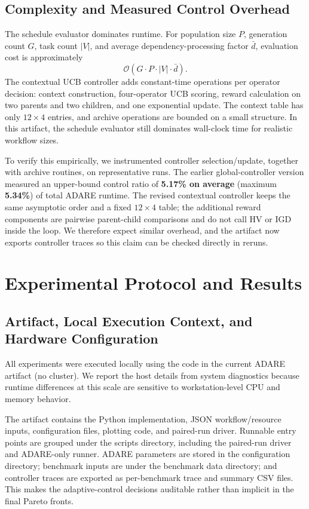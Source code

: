 \documentclass[runningheads]{llncs}
\begin{document}
\subsection{Complexity and Measured Control Overhead}
The schedule evaluator dominates runtime. For population size $P$, generation count $G$, task count $|V|$, and average dependency-processing factor $\bar d$, evaluation cost is approximately
\begin{equation}
\mathcal{O}(G \cdot P \cdot |V| \cdot \bar d).
\end{equation}
The contextual UCB controller adds constant-time operations per operator decision: context construction, four-operator UCB scoring, reward calculation on two parents and two children, and one exponential update. The context table has only $12 \times 4$ entries, and archive operations are bounded on a small structure. In this artifact, the schedule evaluator still dominates wall-clock time for realistic workflow sizes.

To verify this empirically, we instrumented controller selection/update, together with archive routines, on representative runs. The earlier global-controller version measured an upper-bound control ratio of \textbf{5.17\% on average} (maximum \textbf{5.34\%}) of total ADARE runtime. The revised contextual controller keeps the same asymptotic order and a fixed $12 \times 4$ table; the additional reward components are pairwise parent-child comparisons and do not call HV or IGD inside the loop. We therefore expect similar overhead, and the artifact now exports controller traces so this claim can be checked directly in reruns.

\section{Experimental Protocol and Results}
\subsection{Artifact, Local Execution Context, and Hardware Configuration}
All experiments were executed locally using the code in the current ADARE artifact (no cluster). We report the host details from system diagnostics because runtime differences at this scale are sensitive to workstation-level CPU and memory behavior.

The artifact contains the Python implementation, JSON workflow/resource inputs, configuration files, plotting code, and paired-run driver. Runnable entry points are grouped under the scripts directory, including the paired-run driver and ADARE-only runner. ADARE parameters are stored in the configuration directory; benchmark inputs are under the benchmark data directory; and controller traces are exported as per-benchmark trace and summary CSV files. This makes the adaptive-control decisions auditable rather than implicit in the final Pareto fronts.
\end{document}
